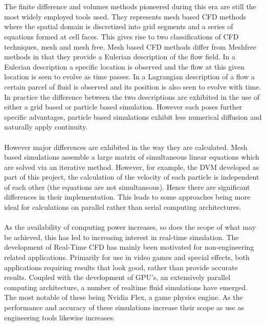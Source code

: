 \\\\
The finite difference and volumes methods pioneered during this era are still the most widely employed tools used. They represents mesh based CFD methods where the spatial domain is discretized into  grid segments and  a series of equations formed at cell faces. This gives rise to two classifications of CFD techniques, mesh and mesh free. Mesh based CFD methods differ from Meshfree methods in that they provide a Eulerian description of the flow field. In a Eulerian description a specific location is observed and the flow at this given location is seen to evolve as time passes. In a Lagrangian description of a flow a certain parcel of fluid is observed and its position is also seen to evolve with time. In practice the difference between the two descriptions are exhibited in the use of either a grid based or particle based simulation. However each poses further specific advantages, particle based simulations exhibit less numerical diffusion and naturally apply continuity. 
\\\\
However major differences are exhibited in the way they are calculated. Mesh based simulations assemble a large matrix of simultaneous linear equations which are solved via an iterative method. However, for example, the DVM developed as part of this project, the calculation of the velocity of each particle is independent of each other (the equations are not simultaneous). Hence there are significant differences in their implementation. This leads to some approaches being more ideal for calculations on parallel rather than serial computing architectures.
\\\\
As the availability of computing power increases, so does the scope of what may be achieved, this has led to increasing interest in real-time simulation. The development of Real-Time CFD has mainly been motivated for non-engineering related applications. Primarily for use in video games and special effects, both applications requiring results that look good, rather than provide accurate results. Coupled with the development of GPU's, an extensively parallel computing architecture, a number of realtime fluid simulations have emerged. The most notable of these being Nvidia Flex, a game physics engine. As the performance and accuracy of these simulations increase their scope as use as engineering tools likewise increases.
\\\\
